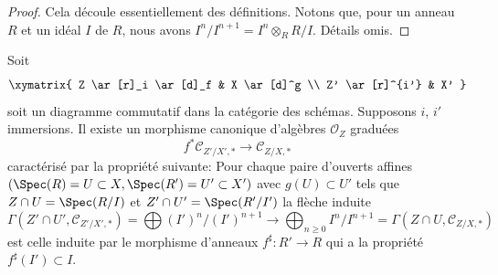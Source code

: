 \begin{proof}
 Cela découle essentiellement des définitions. Notons que, pour un anneau
 $R$  et un idéal  $I$  de  $R$, nous avons  $I^n/I^{n + 1} = I^n \otimes_R R/I$.
Détails omis.
\end{proof}

\begin{lemma}
\label{lemma-conormal-algebra-functorial}
Soit
$$
\xymatrix{
Z \ar[r]_i \ar[d]_f & X \ar[d]^g \\
Z' \ar[r]^{i'} & X'
}
$$
soit un diagramme commutatif dans la catégorie des schémas. Supposons
 $i$,  $i'$  immersions. Il existe un morphisme canonique d'algèbres
 $\mathcal{O}_Z$ graduées
$$
f^*\mathcal{C}_{Z'/X', *}
\longrightarrow
\mathcal{C}_{Z/X, *}
$$
caractérisé par la propriété suivante: Pour chaque paire d'ouverts affines
 $(\Spec(R) = U \subset X, \Spec(R') = U' \subset X')$  avec  $g(U) \subset U'$  tels que  $Z \cap U = \Spec(R/I)$  et  $Z' \cap U' = \Spec(R'/I')$  la flèche
induite
$$
\Gamma(Z' \cap U', \mathcal{C}_{Z'/X', *}) =
\bigoplus\nolimits (I')^n/(I')^{n + 1}
\longrightarrow
\bigoplus\nolimits_{n \geq 0} I^n/I^{n + 1} =
\Gamma(Z \cap U, \mathcal{C}_{Z/X, *})
$$
est celle induite par le morphisme d'anneaux  $f^\sharp : R' \to R$  qui a la propriété
 $f^\sharp(I') \subset I$.
\end{lemma}

